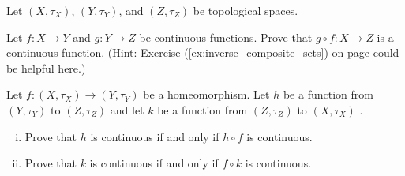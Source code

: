 \item Let $(X, \tau_X)$, $(Y, \tau_Y)$, and $(Z, \tau_Z)$ be topological spaces.
\ba
\item Let $f: X \to Y$ and $g : Y \to Z$ be continuous functions. Prove that $g \circ f : X \to Z$ is a continuous function. (Hint: Exercise (\ref{ex:inverse_composite_sets}) on page \pageref{ex:inverse_composite_sets} could be helpful here.)

\item Let $f: (X, \tau_X) \to (Y, \tau_Y)$ be a homeomorphism. Let $h$ be a function from $(Y, \tau_Y)$ to $(Z, \tau_Z)$ and let $k$ be a function from $(Z, \tau_Z)$ to $(X, \tau_X)$ . 
	\begin{enumerate}[i.]
	\item Prove that $h$ is continuous if and only if $h \circ f$ is continuous. 
	
	\item Prove that $k$ is continuous if and only if $f \circ k$ is continuous. 

	\end{enumerate}
\ea

